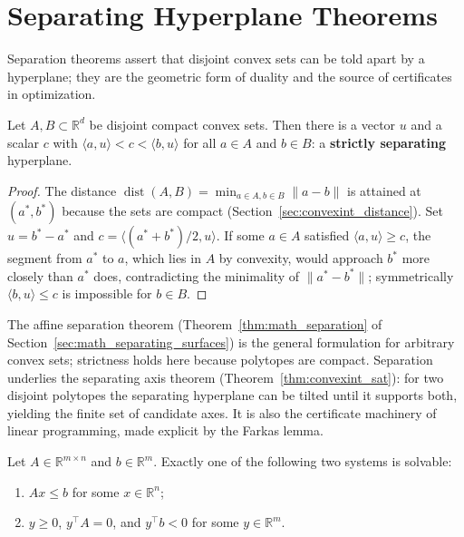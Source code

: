 
\section{Separating Hyperplane Theorems}
\label{sec:polytopes_separating}

Separation theorems assert that disjoint convex sets can be told apart by a
hyperplane; they are the geometric form of duality and the source of
certificates in optimization.

\begin{theorem}\label{thm:polytopes_strict_separation}
  Let $A, B \subset \mathbb{R}^d$ be disjoint compact convex sets. Then
  there is a vector $u$ and a scalar $c$ with
  $\langle a, u \rangle < c < \langle b, u \rangle$ for all $a \in A$ and
  $b \in B$: a \textbf{strictly separating} hyperplane.
\end{theorem}

\begin{proof}
  The distance $\operatorname{dist}(A,B) = \min_{a \in A, b \in B}
  \|a-b\|$ is attained at $(a^*, b^*)$ because the sets are compact
  (Section~\ref{sec:convexint_distance}). Set $u = b^* - a^*$ and
  $c = \langle (a^*+b^*)/2, u \rangle$. If some $a \in A$ satisfied
  $\langle a, u \rangle \ge c$, the segment from $a^*$ to $a$, which lies in
  $A$ by convexity, would approach $b^*$ more closely than $a^*$ does,
  contradicting the minimality of $\|a^* - b^*\|$; symmetrically
  $\langle b, u \rangle \le c$ is impossible for $b \in B$.
\end{proof}

The affine separation theorem
(Theorem~\ref{thm:math_separation} of Section~\ref{sec:math_separating_surfaces})
is the general formulation for arbitrary convex sets; strictness holds here
because polytopes are compact. Separation underlies the separating axis
theorem (Theorem~\ref{thm:convexint_sat}): for two disjoint polytopes the
separating hyperplane can be tilted until it supports both, yielding the
finite set of candidate axes. It is also the certificate machinery of linear
programming, made explicit by the Farkas lemma.

\begin{theorem}\label{thm:polytopes_farkas}
  Let $A \in \mathbb{R}^{m \times n}$ and $b \in \mathbb{R}^m$. Exactly one
  of the following two systems is solvable:
  \begin{enumerate}
    \item $Ax \le b$ for some $x \in \mathbb{R}^n$;
    \item $y \ge 0$, $y^{\top} A = 0$, and $y^{\top} b < 0$ for some
      $y \in \mathbb{R}^m$.
  \end{enumerate}
\end{theorem}

